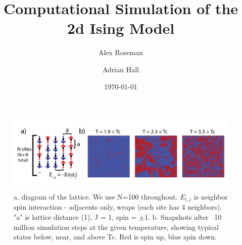 \documentclass[letter,scriptaddress,twocolumn, prl]{revtex4}
\begin{document}
\title{Computational Simulation of the 2d Ising Model}

\author{Alex Roseman}
\author{Adrian Hall}
\date{\today}

\begin{abstract}

\end{abstract}

\maketitle

\begin{figure}[t]
	\begin{center}
		\includegraphics[width=1\textwidth]{figs/fig1.png}
		\caption{a. diagram of the lattice. We use N=100 throughout. $E_{i, j}$ is neighbor spin interaction - adjacents only, wraps (each site has 4 neighbors). "a" is lattice distance (1), J = 1, spin = $\pm 1$. b. Snapshots after ~10 million simulation steps at the given temperature, showing typical states below, near, and above Tc. Red is spin up, blue spin down.}
		\label{fig:fig1}
	\end{center}
\end{figure}
\end{document}
